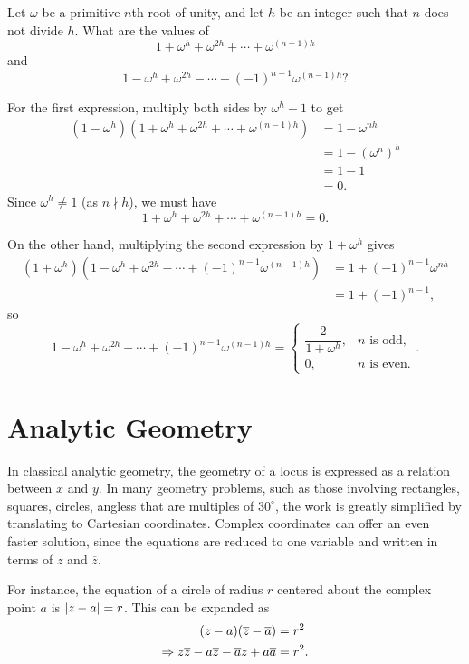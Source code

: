\begin{exercise}
	Let $\omega$ be a primitive $n$th root of unity, and let $h$ be an integer such that $n$ does not divide $h$. What are the values of $$1+\omega^h+\omega^{2h}+\cdots+\omega^{(n-1)h}$$ and $$1-\omega^h+\omega^{2h}-\cdots+(-1)^{n-1}\omega^{(n-1)h}?$$
	
	\begin{sol}
		For the first expression, multiply both sides by $\omega^h-1$ to get
		\begin{align*}
			(1-\omega^h)(1+\omega^h+\omega^{2h}+\cdots+\omega^{(n-1)h}) &=1-\omega^{nh} \\
			&=1-(\omega^n)^h \\
			&=1-1 \\
			&=0.
		\end{align*}
		Since $\omega^h \neq 1$ (as $n \nmid h$), we must have $$1+\omega^h+\omega^{2h}+\cdots+\omega^{(n-1)h}=\boxed{0}.$$
		
		On the other hand, multiplying the second expression by $1+\omega^h$ gives
		\begin{align*}
			(1+\omega^h)(1-\omega^h+\omega^{2h}-\cdots+(-1)^{n-1}\omega^{(n-1)h}) &=1+(-1)^{n-1}\omega^{nh} \\
			&=1+(-1)^{n-1},
		\end{align*}
		so $$1-\omega^h+\omega^{2h}-\cdots+(-1)^{n-1}\omega^{(n-1)h} =\begin{cases}
			\dfrac{2}{1+\omega^h}, & n \text{ is odd}, \\
			0, & n \text{ is even}.
		\end{cases}.$$
	\end{sol}
\end{exercise}

\section{Analytic Geometry}
\label{sec:analytic-geometry}
In classical analytic geometry, the geometry of a locus is expressed as a relation between $x$ and $y$. In many geometry problems, such as those involving rectangles, squares, circles, angless that are multiples of $30^\circ$, the work is greatly simplified by translating to Cartesian coordinates. Complex coordinates can offer an even faster solution, since the equations are reduced to one variable and written in terms of $z$ and $\overline{z}$.

For instance, the equation of a circle of radius $r$ centered about the complex point $a$ is $\lvert z-a \rvert=r$. This can be expanded as
\begin{align*}
	(z-a)(\overline{z}-\overline{a}) &=r^2 \\
	\Rightarrow z\overline{z}-a\overline{z}-\overline{a}z+a\overline{a} &=r^2.
\end{align*}


